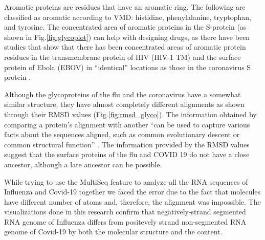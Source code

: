 \documentclass[conference]{IEEEtran}
\begin{document}
Aromatic proteins are residues that have an aromatic ring. The following are classified as aromatic according to VMD: histidine, phenylalanine, tryptophan, and tyrosine. The concentrated area of aromatic proteins in the S-protein (as shown in Fig.\ref{fig:glycoplot}) can help with designing drugs, as there have been studies that show that there has been concentrated areas of aromatic protein residues in the transmembrane protein of HIV (HIV-1 TM) and the surface protein of Ebola (EBOV) in “identical” locations as those in the coronavirus S protein \citep{Saintz}. 

Although the glycoproteins of the flu and the coronavirus have a somewhat similar structure, they have almost completely different alignments as shown through their RMSD values (Fig.\ref{fig:rmsd_glyco}). The information obtained by comparing a protein’s alignment with another “can be used to capture various facts about the sequences aligned, such as common evolutionary descent or common structural function” \citep{Altschul}. The information provided by the RMSD values suggest that the surface proteins of the flu and COVID 19 do not have a close ancestor, although a late ancestor can be possible.  

While trying to use the MultiSeq feature to analyze all the RNA sequences of Influenza and Covid-19 together we faced the error due to the fact that molecules have different number of atoms and, therefore, the alignment was impossible. The visualizations done in this research confirm that negatively-strand segmented RNA genome of Influenza differs from positevely strand non-segmented RNA genome of Covid-19 by both the molecular structure and the content.
\end{document}
